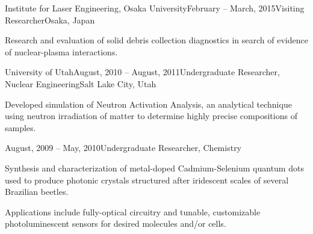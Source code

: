 \begin{rSubsection}{Institute for Laser Engineering, Osaka University}{February -- March,  2015}{Visiting Researcher}{Osaka, Japan}
\item    Research and evaluation of solid debris collection diagnostics in search of evidence of nuclear-plasma interactions.
\end{rSubsection}
% 
% 





\begin{rSubsection}{University of Utah}{August, 2010 -- August, 2011}{Undergraduate Researcher, Nuclear Engineering}{Salt Lake City, Utah}
\item Developed simulation of Neutron Activation Analysis, an analytical technique using neutron irradiation of matter to determine highly precise compositions of samples.
\end{rSubsection}\vspace{-1.5\baselineskip}
\begin{rSubsection}{}{August, 2009 -- May, 2010}{Undergraduate Researcher, Chemistry}{}
\item  Synthesis and characterization of metal-doped Cadmium-Selenium quantum dots used to produce photonic crystals structured after iridescent scales of several Brazilian beetles.
\item  Applications include fully-optical circuitry and tunable, customizable photoluminescent sensors for desired molecules and/or cells.
\end{rSubsection}

